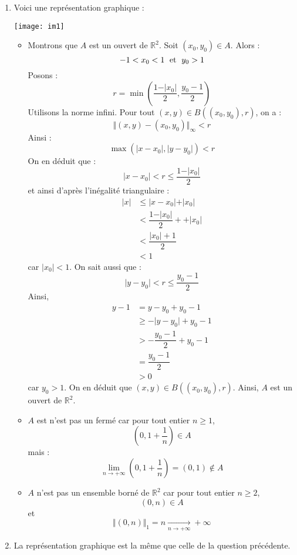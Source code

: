 \documentclass[a4paper,10pt]{report}
\begin{document}
\corr

\begin{enumerate}
\item Voici une représentation graphique : 

\begin{center}
\texttt{[image: im1]}
\end{center}
\begin{itemize}
\item Montrons que $A$ est un ouvert de $\mathbb{R}^2$. Soit $(x_0,y_0) \in A$. Alors :
$$ -1 < x_0 < 1 \; \hbox{ et } \; y_0>1$$
Posons :
$$ r = \min \left( \dfrac{1-\vert x_0\vert}{2}, \dfrac{y_0-1}{2} \right)$$
Utilisons la norme infini. Pour tout $(x,y) \in B((x_0,y_0),r)$, on a :
$$ \Vert (x,y)-(x_0,y_0) \Vert_{\infty} <r $$
Ainsi :
$$ \max (\vert x-x_0 \vert, \vert y-y_0 \vert)<r$$
On en déduit que :
$$ \vert x-x_0 \vert < r \leq \dfrac{1-\vert x_0\vert}{2}$$
et ainsi d'après l'inégalité triangulaire :
\begin{align*}
\vert x \vert & \leq \vert x-x_0 \vert + \vert x_0 \vert \\
& <\dfrac{1-\vert x_0\vert}{2} + + \vert x_0 \vert \\ 
& < \dfrac{\vert x_0 \vert + 1 }{2}\\
& < 1
\end{align*}
car $\vert x_0 \vert <1$. On sait aussi que :
$$  \vert y-y_0 \vert < r \leq \dfrac{y_0-1}{2}$$
Ainsi, 
\begin{align*}
y-1 &= y-y_0 + y_0-1 \\
& \geq - \vert y- y_0 \vert + y_0-1 \\
& > - \dfrac{y_0-1}{2} + y_0-1 \\
& = \dfrac{y_0-1}{2}\\
& >0
\end{align*}
car $y_0>1$. On en déduit que $(x,y) \in B((x_0,y_0),r)$. Ainsi, $A$ est un ouvert de $\mathbb{R}^2$.
\item $A$ est n'est pas un fermé car pour tout entier $n \geq 1$,
$$ \left(0,1+ \dfrac{1}{n} \right) \in A$$
mais :
$$ \lim_{n \rightarrow + \infty} \left(0,1 + \dfrac{1}{n}\right) = (0,1) \notin A$$
\item $A$ n'est pas un ensemble borné de $\mathbb{R}^2$ car pour tout entier $n \geq 2$,
$$ (0,n) \in A$$
et 
$$ \Vert (0,n) \Vert_1 = n \underset{n \rightarrow + \infty}{\longrightarrow} + \infty$$
\end{itemize}
\item La représentation graphique est la même que celle de la question précédente. 

\end{enumerate}
\end{document}
